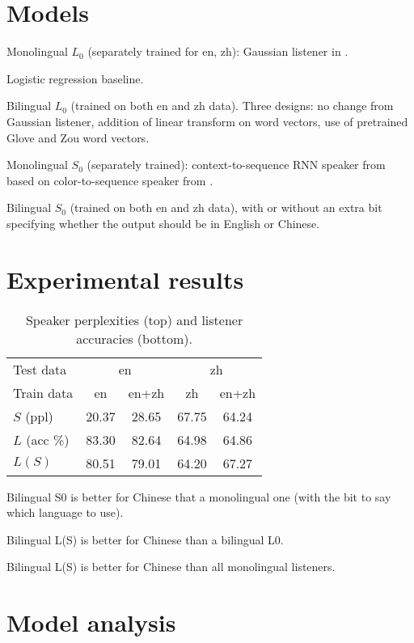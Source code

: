 \documentclass[11pt,a4paper]{article}
\begin{document}
\section{Models}

Monolingual $L_0$ (separately trained for en, zh): Gaussian listener in \citet{Monroe2017}.

Logistic regression baseline.

Bilingual $L_0$ (trained on both en and zh data). Three designs: no change from Gaussian listener, addition of linear transform on word vectors, use of pretrained Glove
and Zou
word vectors.

Monolingual $S_0$ (separately trained): context-to-sequence RNN speaker from \citet{Monroe2017} based on color-to-sequence speaker from \citet{MonroeGoodmanPotts16_Color}.

Bilingual $S_0$ (trained on both en and zh data), with or without an extra bit specifying whether the output should be in English or Chinese.

\section{Experimental results}

\begin{table}
\begin{tabular}{lcccc}
\toprule
Test data & \multicolumn{2}{c}{en} & \multicolumn{2}{c}{zh} \\
Train data & en & en+zh & zh & en+zh \\
\midrule
$S$ (ppl) & 20.37 & 28.65 & 67.75 & 64.24 \\
\midrule
$L$ (acc \%) & 83.30 & 82.64 & 64.98 & 64.86 \\
$L(S)$ & 80.51 & 79.01 & 64.20 & 67.27 \\
\bottomrule
\end{tabular}
\caption{Speaker perplexities (top) and listener accuracies (bottom).}
\end{table}

Bilingual S0 is better for Chinese that a monolingual one (with the bit to say which language to use).

Bilingual L(S) is better for Chinese than a bilingual L0.

Bilingual L(S) is better for Chinese than all monolingual listeners.

\section{Model analysis}
\end{document}
